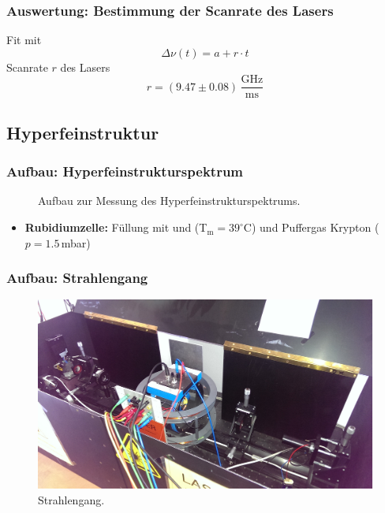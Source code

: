 \begin{frame}
\frametitle{Auswertung: Bestimmung der Scanrate des Lasers}
Fit mit
\begin{equation*}
    \Delta \nu(t) = a + r \cdot t
\end{equation*}
\pause
Scanrate $r$ des Lasers
\begin{equation*}
    r = (9.47 \pm 0.08)\,\frac{\text{GHz}}{\text{ms}}
\end{equation*}
\end{frame}

\subsection{Hyperfeinstruktur}

\begin{frame}
\frametitle{Aufbau: Hyperfeinstrukturspektrum}
\begin{figure}
    \centering
    \def\svgwidth{\textwidth}
    
    \caption{Aufbau zur Messung des Hyperfeinstrukturspektrums.}
\end{figure}
\begin{itemize}
  \item \textbf{Rubidiumzelle:} Füllung mit  und  (T$_\text{m}=39^\circ$C)
  und Puffergas Krypton ($p=1.5$\,mbar)
\end{itemize}
\end{frame}


\begin{frame}
\frametitle{Aufbau: Strahlengang}
\begin{figure}[H]
    \centering
    \includegraphics[width=\textwidth]{../img/aufbau_strahlengang.jpg}
    \caption{Strahlengang.}
\end{figure}
\end{frame}

